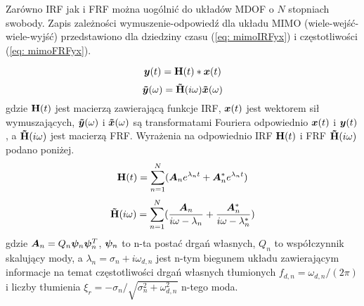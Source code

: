 Zarówno IRF jak i FRF można uogólnić do układów MDOF o $N$ stopniach swobody. Zapis zależności wymuszenie-odpowiedź dla układu MIMO (wiele-wejść-wiele-wyjść) przedstawiono dla dziedziny czasu (\ref{eq: mimoIRFyx}) i częstotliwości (\ref{eq: mimoFRFyx}).

\begin{equation} \label{eq: mimoIRFyx}
	\bm{y}(t)=\mathbf{H}(t)*\bm{x}(t)
\end{equation}
\begin{equation} \label{eq: mimoFRFyx}
	\bm{\tilde{y}}(\omega)=\mathbf{\tilde{H}}(i\omega)\bm{\tilde{x}}(\omega)
\end{equation}
gdzie $\mathbf{H}(t)$ jest macierzą zawierającą funkcje IRF, $\bm{x}(t)$ jest wektorem sił wymuszających, $\bm{\tilde{y}}(\omega)$ i $\bm{\tilde{x}}(\omega)$ są transformatami Fouriera odpowiednio $\bm{x}(t)$ i $\bm{y}(t)$, a $\mathbf{\tilde{H}}(i\omega)$ jest macierzą FRF. Wyrażenia na odpowiednio IRF $\mathbf{H}(t)$ i FRF $\mathbf{\tilde{H}}(i\omega)$ podano poniżej.
\begin{equation}
	\mathbf{H}(t)=\sum_{n=1}^{N}(\bm{A}_n e^{\lambda_n t} + \bm{A}_n^* e^{\lambda_n t})
\end{equation}
\begin{equation}
	\mathbf{\tilde{H}}(i\omega)=\sum_{n=1}^{N}(\frac{\bm{A}_n}{i\omega-\lambda_n} + \frac{\bm{A}_n^*}{i\omega-\lambda_n^*})
\end{equation}
gdzie $\bm{A}_n=Q_n \bm{\psi}_n\bm{\psi}_n^T$, $\bm{\psi}_n$ to n-ta postać drgań własnych, $Q_n$ to współczynnik skalujący mody, a $\lambda_n=\sigma_n+i\omega_{d,n}$ jest n-tym biegunem układu zawierającym informacje na temat częstotliwości drgań własnych tłumionych $f_{d,n}=\omega_{d,n}/(2\pi)$ i liczby tłumienia $\xi_r=-\sigma_n/\sqrt{\sigma_n^2+\omega_{d,n}^2}$ n-tego moda.






